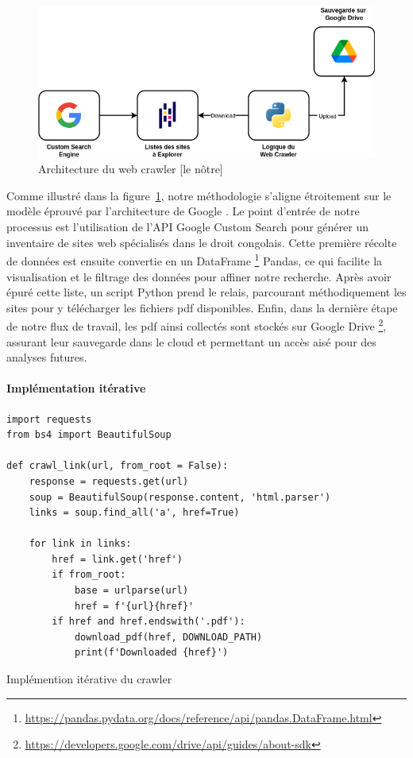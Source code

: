 \begin{figure}[H]
    \centering
    \includegraphics[width=15cm]{gfx/fig-crawler-architecture.png}
    \caption{Architecture du web crawler [le nôtre]}
    \label{fig:crawler-architecture}
\end{figure}

Comme illustré dans la figure~\ref{fig:crawler-architecture}, notre méthodologie s'aligne étroitement sur le modèle éprouvé par l'architecture de Google \cite{BRIN1998107}. Le point d'entrée de notre processus est l'utilisation de l'API Google Custom Search pour générer un inventaire de sites web spécialisés dans le droit congolais. Cette première récolte de données est ensuite convertie en un DataFrame \footnote{\href{https://pandas.pydata.org/docs/reference/api/pandas.DataFrame.html}{https://pandas.pydata.org/docs/reference/api/pandas.DataFrame.html}} Pandas, ce qui facilite la visualisation et le filtrage des données pour affiner notre recherche. Après avoir épuré cette liste, un script Python prend le relais, parcourant méthodiquement les sites pour y télécharger les fichiers \ac{pdf} disponibles. Enfin, dans la dernière étape de notre flux de travail, les \ac{pdf} ainsi collectés sont stockés sur Google Drive \footnote{\href{https://developers.google.com/drive/api/guides/about-sdk}{https://developers.google.com/drive/api/guides/about-sdk}}, assurant leur sauvegarde dans le cloud et permettant un accès aisé pour des analyses futures.

\paragraph{Implémentation itérative} \hspace{0pt}

\begin{listing}[!ht]
\begin{verbatim}
import requests
from bs4 import BeautifulSoup

def crawl_link(url, from_root = False):
    response = requests.get(url)
    soup = BeautifulSoup(response.content, 'html.parser')
    links = soup.find_all('a', href=True)

    for link in links:
        href = link.get('href')
        if from_root:
            base = urlparse(url)
            href = f'{url}{href}'
        if href and href.endswith('.pdf'):
            download_pdf(href, DOWNLOAD_PATH)
            print(f'Downloaded {href}')
\end{verbatim}
\caption{Implémention itérative du crawler}
\label{appendix:code:python:iterative-crawl-function}
\end{listing}

